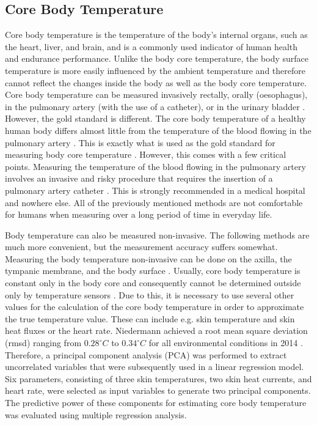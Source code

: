 \subsection{Core Body Temperature}
\label{Background:BodyTemperature:CBT}
Core body temperature is the temperature of the body's internal organs, such as the heart, liver, and brain, and is a commonly used indicator of human health and endurance performance.
Unlike the body core temperature, the body surface temperature is more easily influenced by the ambient temperature and therefore cannot reflect the changes inside the body as well as the body core temperature.
Core body temperature can be measured invasively rectally, orally (oesophagus), in the pulmonary artery (with the use of a catheter), or in the urinary bladder \cite{moranCoreTemperatureMeasurement2002a}.
However, the gold standard is different.
The core body temperature of a healthy human body differs almost little from the temperature of the blood flowing in the pulmonary artery \cite{krizanacFemoroiliacalArteryPulmonary2013, holtzclawMonitoringBodyTemperature1993}.
This is exactly what is used as the gold standard for measuring body core temperature \cite{krizanacFemoroiliacalArteryPulmonary2013, holtzclawMonitoringBodyTemperature1993, fulbrookCoreBodyTemperature1997, maxtonEstimatingCoreTemperature2004}.
However, this comes with a few critical points.
Measuring the temperature of the blood flowing in the pulmonary artery involves an invasive and risky procedure that requires the insertion of a pulmonary artery catheter \cite{yeohRevisitingTympanicMembrane2017}.
This is strongly recommended in a medical hospital and nowhere else.
All of the previously mentioned methods are not comfortable for humans when measuring over a long period of time in everyday life.

Body temperature can also be measured non-invasive.
The following methods are much more convenient, but the measurement accuracy suffers somewhat.
Measuring the body temperature non-invasive can be done on the axilla, the tympanic membrane, and the body surface \cite{moranCoreTemperatureMeasurement2002a}.
Usually, core body temperature is constant only in the body core and consequently cannot be determined outside only by temperature sensors \cite{niedermannPredictionHumanCore2014}.
Due to this, it is necessary to use several other values for the calculation of the core body temperature in order to approximate the true temperature value. 
These can include e.g. skin temperature and skin heat fluxes or the heart rate.
Niedermann achieved a root mean square deviation (rmsd) ranging from $0.28 ^\circ C$ to $0.34 ^\circ C$ for all environmental conditions in 2014 \cite{niedermannPredictionHumanCore2014}.
Therefore, a principal component analysis (PCA) was performed to extract uncorrelated variables that were subsequently used in a linear regression model. 
Six parameters, consisting of three skin temperatures, two skin heat currents, and heart rate, were selected as input variables to generate two principal components. 
The predictive power of these components for estimating core body temperature was evaluated using multiple regression analysis.

